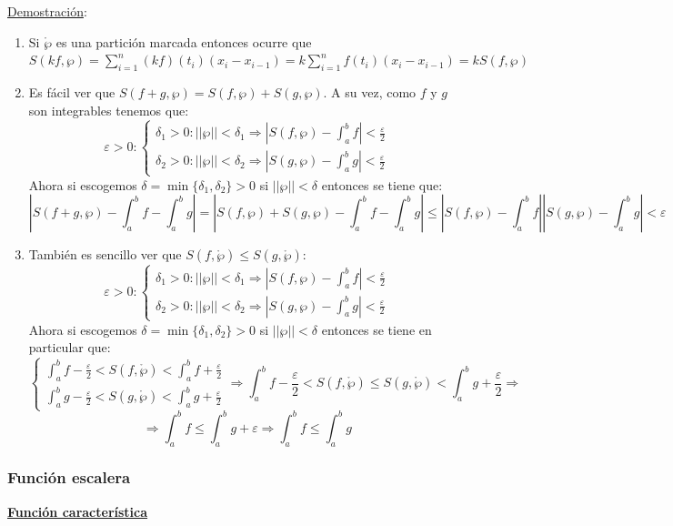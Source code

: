 \documentclass[10pt,a4paper,openright]{book}
\begin{document}
\underline{Demostración}:

\begin{enumerate}
\item Si $\mathring{\wp}$ es una partición marcada entonces ocurre que $S(kf,\wp) = \sum_{i=1}^n(kf)(t_i)(x_i-x_{i-1})=k\sum_{i=1}^n f(t_i)(x_i-x_{i-1})=kS(f,\wp)$

\item Es fácil ver que $S(f+g, \wp)=S(f,\wp)+S(g,\wp)$. A su vez, como $f$ y $g$ son integrables tenemos que:
$$\varepsilon > 0 : \begin{cases}\delta_1>0: ||\wp ||<\delta_1\Rightarrow \left|S(f,\wp)-\int_a^b f\right|<\frac{\varepsilon}{2} \\ \delta_2>0: ||\wp ||<\delta_2\Rightarrow \left|S(g,\wp)-\int_a^b g\right|<\frac{\varepsilon}{2}  \end{cases}$$
Ahora si escogemos $\delta = \min\{\delta_1, \delta_2\}>0$ si $||\wp ||<\delta$ entonces se tiene que:
$$\left| S(f+g,\wp)-\int_a^b f-\int_a^b g \right|=\left|S(f,\wp)+S(g,\wp)-\int_a^b f-\int_a^b g\right| \leq \left|S(f,\wp)-\int_a^b f\right|\left| S(g,\wp)-\int_a^b g\right| <\varepsilon $$

\item También es sencillo ver que $S(f,\mathring{\wp}) \leq S(g,\mathring{\wp})$:
$$\varepsilon > 0 : \begin{cases}\delta_1>0: ||\wp ||<\delta_1\Rightarrow \left|S(f,\wp)-\int_a^b f\right|<\frac{\varepsilon}{2} \\ \delta_2>0: ||\wp ||<\delta_2\Rightarrow \left|S(g,\wp)-\int_a^b g\right|<\frac{\varepsilon}{2}  \end{cases}$$
Ahora si escogemos $\delta = \min\{\delta_1, \delta_2\}>0$ si $||\wp ||<\delta$ entonces se tiene en particular que:
$$\begin{cases} \int_{a}^{b} f -\frac{\varepsilon}{2} < S(f,\mathring{\wp}) < \int_{a}^{b} f + \frac{\varepsilon}{2} \\ \int_{a}^{b} g -\frac{\varepsilon}{2} < S(g,\mathring{\wp}) < \int_{a}^{b} g + \frac{\varepsilon}{2}\end{cases}\Rightarrow  \int_{a}^{b} f -\frac{\varepsilon}{2} < S(f,\mathring{\wp}) \leq S(g,\mathring{\wp}) < \int_{a}^{b} g + \frac{\varepsilon}{2}\Rightarrow $$
$$\Rightarrow \int_{a}^{b}f\leq \int_{a}^{b}g +\varepsilon\Rightarrow \int_{a}^{b}f\leq \int_{a}^{b}g$$
\end{enumerate}

\subsubsection*{Función escalera}
\underline{\textbf{Función característica}}
\end{document}
